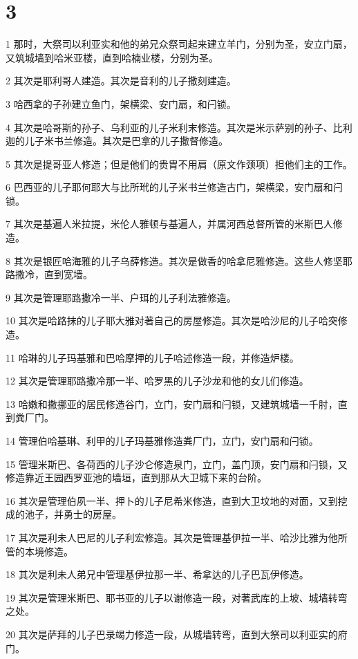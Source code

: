 \chapter{3}

\par 1 那时，大祭司以利亚实和他的弟兄众祭司起来建立羊门，分别为圣，安立门扇，又筑城墙到哈米亚楼，直到哈楠业楼，分别为圣。
\par 2 其次是耶利哥人建造。其次是音利的儿子撒刻建造。
\par 3 哈西拿的子孙建立鱼门，架横梁、安门扇，和闩锁。
\par 4 其次是哈哥斯的孙子、乌利亚的儿子米利末修造。其次是米示萨别的孙子、比利迦的儿子米书兰修造。其次是巴拿的儿子撒督修造。
\par 5 其次是提哥亚人修造；但是他们的贵胄不用肩（原文作颈项）担他们主的工作。
\par 6 巴西亚的儿子耶何耶大与比所玳的儿子米书兰修造古门，架横梁，安门扇和闩锁。
\par 7 其次是基遍人米拉提，米伦人雅顿与基遍人，并属河西总督所管的米斯巴人修造。
\par 8 其次是银匠哈海雅的儿子乌薛修造。其次是做香的哈拿尼雅修造。这些人修坚耶路撒冷，直到宽墙。
\par 9 其次是管理耶路撒冷一半、户珥的儿子利法雅修造。
\par 10 其次是哈路抹的儿子耶大雅对著自己的房屋修造。其次是哈沙尼的儿子哈突修造。
\par 11 哈琳的儿子玛基雅和巴哈摩押的儿子哈述修造一段，并修造炉楼。
\par 12 其次是管理耶路撒冷那一半、哈罗黑的儿子沙龙和他的女儿们修造。
\par 13 哈嫩和撒挪亚的居民修造谷门，立门，安门扇和闩锁，又建筑城墙一千肘，直到粪厂门。
\par 14 管理伯哈基琳、利甲的儿子玛基雅修造粪厂门，立门，安门扇和闩锁。
\par 15 管理米斯巴、各荷西的儿子沙仑修造泉门，立门，盖门顶，安门扇和闩锁，又修造靠近王园西罗亚池的墙垣，直到那从大卫城下来的台阶。
\par 16 其次是管理伯夙一半、押卜的儿子尼希米修造，直到大卫坟地的对面，又到挖成的池子，并勇士的房屋。
\par 17 其次是利未人巴尼的儿子利宏修造。其次是管理基伊拉一半、哈沙比雅为他所管的本境修造。
\par 18 其次是利未人弟兄中管理基伊拉那一半、希拿达的儿子巴瓦伊修造。
\par 19 其次是管理米斯巴、耶书亚的儿子以谢修造一段，对著武库的上坡、城墙转弯之处。
\par 20 其次是萨拜的儿子巴录竭力修造一段，从城墙转弯，直到大祭司以利亚实的府门。
